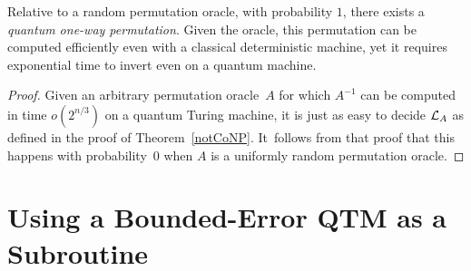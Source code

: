 \begin{corollary}
Relative to a random permutation oracle, with probability $1$,
there exists a {\em quantum one-way permutation}.
Given the oracle, this permutation can be computed efficiently even
with a classical deterministic machine, yet it requires exponential
time to invert even on a quantum machine.
\end{corollary}

\begin{proof}
Given an arbitrary permutation oracle~$A$
for which $A^{-1}$ can be computed in time $o(2^{n/3})$
on a quantum Turing machine, it is just as easy to decide
${\cal L}_A$ as defined in the proof of Theorem~\ref{notCoNP}.
It~follows from that proof that this happens with probability~0
when $A$ is a uniformly random permutation oracle.
\end{proof}

\section{Using a Bounded-Error QTM as a Subroutine}
\label{section.subroutine}


